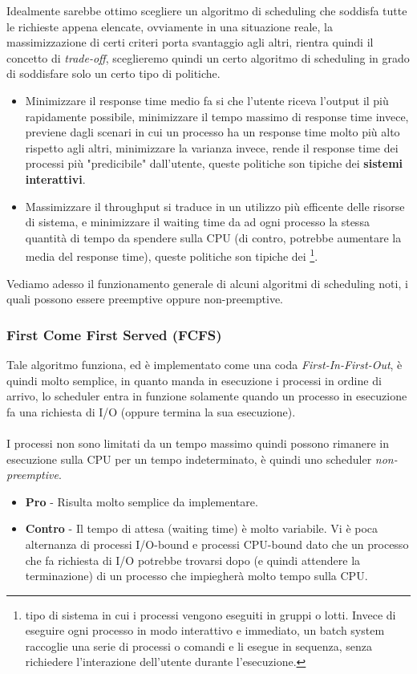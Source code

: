 \documentclass[12pt, letterpaper]{article}
\newcommand{\acc}{\\\hphantom{}\\}
\begin{document}
Idealmente sarebbe ottimo scegliere un algoritmo di scheduling che soddisfa 
tutte le richieste appena elencate, ovviamente in una situazione reale, la 
massimizzazione di certi criteri porta svantaggio agli altri, rientra 
quindi il concetto di \textit{trade-off}, sceglieremo quindi un certo 
algoritmo di scheduling in grado di soddisfare solo un certo tipo di 
politiche.\begin{itemize}
    \item Minimizzare il response time medio fa si che l'utente 
    riceva l'output il più rapidamente possibile, minimizzare il tempo massimo 
    di response time invece, previene dagli scenari in cui un processo 
    ha un response time molto più alto rispetto agli altri, minimizzare 
    la varianza invece, rende il response time dei processi più "predicibile" 
    dall'utente, queste politiche son tipiche dei \textbf{sistemi interattivi}.
    \item Massimizzare il throughput si traduce in un utilizzo più efficente 
    delle risorse di sistema, e minimizzare il waiting time da ad ogni processo 
    la stessa quantità di tempo da spendere sulla CPU (di contro, potrebbe 
    aumentare la media del response time), queste politiche son tipiche 
    dei \footnote{
        tipo di sistema in cui i processi vengono eseguiti  in gruppi o lotti. Invece di eseguire ogni processo in modo interattivo e immediato, un batch system raccoglie una serie di processi o comandi e li esegue in sequenza, senza richiedere l’interazione dell’utente durante l’esecuzione.
    }.
\end{itemize}
Vediamo adesso il funzionamento generale di alcuni algoritmi di scheduling noti,
i quali possono essere preemptive oppure non-preemptive.
\subsubsection{First Come First Served (FCFS)}
Tale algoritmo funziona, ed è implementato come una coda 
\textit{First-In-First-Out}, è quindi molto semplice, in quanto manda 
in esecuzione i processi in ordine di arrivo, lo scheduler entra in funzione 
solamente quando un processo in esecuzione fa una richiesta 
di I/O (oppure termina la sua esecuzione).\acc I processi non sono limitati 
da un tempo massimo quindi possono rimanere in esecuzione sulla CPU 
per un tempo indeterminato, è quindi uno scheduler \textit{non-preemptive}. 
\begin{itemize}
    \item \textbf{Pro} - Risulta molto semplice da implementare.
    \item \textbf{Contro} - Il tempo di attesa (waiting time) è molto 
    variabile. Vi è poca alternanza di processi I/O-bound e processi 
    CPU-bound dato che un processo che fa richiesta di I/O potrebbe trovarsi 
    dopo (e quindi attendere la terminazione) di un processo che 
    impiegherà molto tempo sulla CPU.
\end{itemize}
\end{document}

